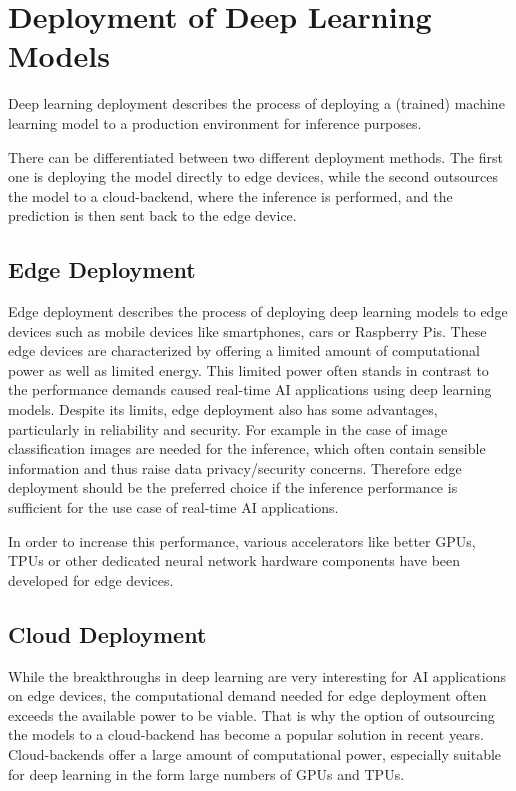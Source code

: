 \section{Deployment of Deep Learning Models}
Deep learning deployment describes the process of deploying a (trained) machine learning model to a production environment for inference purposes. 

There can be differentiated between two different deployment methods. The first one is deploying the model directly to edge devices, while the second outsources the model to a cloud-backend, where the inference is performed, and the prediction is then sent back to the edge device.
\subsection{Edge Deployment}
Edge deployment describes the process of deploying deep learning models to edge devices such as mobile devices like smartphones, cars or Raspberry Pis.
These edge devices are characterized by offering a limited amount of computational power as well as limited energy.
This limited power often stands in contrast to the performance demands caused real-time AI applications using deep learning models.
Despite its limits, edge deployment also has some advantages, particularly in reliability and security. 
For example in the case of image classification images are needed for the inference, which often contain sensible information and thus raise data privacy/security concerns.
Therefore edge deployment should be the preferred choice if the inference performance is sufficient for the use case of real-time AI applications.

In order to increase this performance, various accelerators like better GPUs, TPUs or other dedicated neural network hardware components have been developed for edge devices.



\subsection{Cloud Deployment}
While the breakthroughs in deep learning are very interesting for AI applications on edge devices, the computational demand needed for edge deployment often exceeds the available power to be viable.
That is why the option of outsourcing the models to a cloud-backend has become a popular solution in recent years.
Cloud-backends offer a large amount of computational power, especially suitable for deep learning in the form large numbers of GPUs and TPUs.


